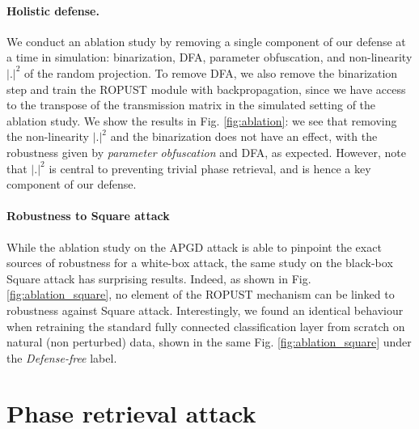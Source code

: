 \documentclass{article}
\begin{document}
\paragraph{Holistic defense.}
We conduct an ablation study by removing a single component of our defense at a time in simulation: binarization, DFA, parameter obfuscation, and non-linearity $|.|^2$ of the random projection. To remove DFA, we also remove the binarization step and train the ROPUST module with backpropagation, since we have access to the transpose of the transmission matrix in the simulated setting of the ablation study. We show the results in Fig. \ref{fig:ablation}: we see that removing the non-linearity $|.|^2$ and the binarization does not have an effect, with the robustness given by \textit{parameter obfuscation} and DFA, as expected. However, note that $|.|^2$ is central to preventing trivial phase retrieval, and is hence a key component of our defense.  
\paragraph{Robustness to Square attack} 
While the ablation study on the APGD attack is able to pinpoint the exact sources of robustness for a white-box attack, the same study on the black-box Square attack has surprising results. Indeed, as shown in Fig. \ref{fig:ablation_square}, no element of the ROPUST mechanism can be linked to robustness against Square attack. Interestingly, we found an identical behaviour when retraining the standard fully connected classification layer from scratch on natural (non perturbed) data, shown in the same Fig. \ref{fig:ablation_square} under the \textit{Defense-free} label.

\section{Phase retrieval attack}\label{sec:phase_retrieval}
\end{document}
